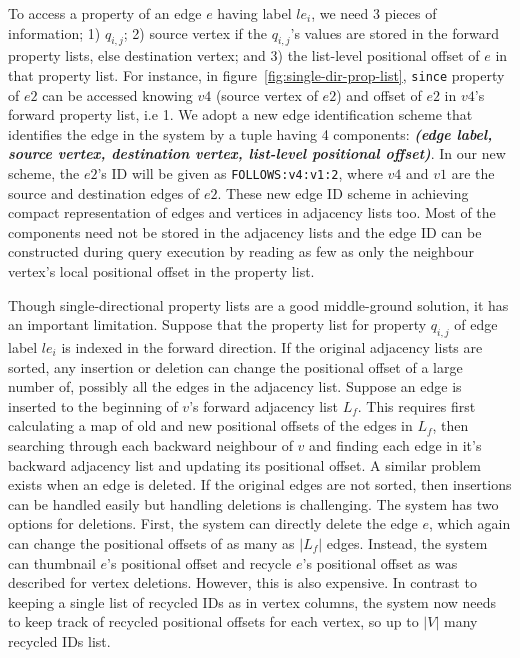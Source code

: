 To access a property of an edge $e$ having label $le_i$, we need 3 pieces of information; 1) $q_{i,j}$; 2) source vertex if the $q_{i,j}$'s values are stored in the forward property lists, else destination vertex; and 3) the list-level positional offset of $e$ in that property list. For instance, in figure~\ref{fig:single-dir-prop-list}, \texttt{since} property of $e2$ can be accessed knowing $v4$ (source vertex of $e2$) and offset of $e2$ in $v4$'s forward property list, i.e 1. We adopt a new edge identification scheme that identifies the edge in the system by a tuple having 4 components: \textbf{\emph{(edge label, source vertex, destination vertex, list-level positional offset)}}. In our new scheme, the $e2$'s ID will be given as \texttt{FOLLOWS:v4:v1:2}, where $v4$ and $v1$ are the source and destination edges of $e2$. These new edge ID scheme in achieving compact representation of edges and vertices in adjacency lists too. Most of the components need not be stored in the adjacency lists and the edge ID can be constructed during query execution by reading as few as only the neighbour vertex's local positional offset in the property list.

 Though single-directional property lists are a good middle-ground solution, it has an important limitation. Suppose that the property list for property $q_{i,j}$ of edge label $le_i$ is indexed in the forward direction. If the original adjacency lists are sorted,  any insertion or deletion can change the positional offset of a large number of, possibly all the edges in the adjacency list. Suppose an edge is inserted to the beginning of $v$'s forward adjacency list $L_f$. This requires first calculating a map of old and new positional offsets of the edges in $L_f$, then searching through each backward neighbour of $v$ and finding each edge in it's backward adjacency list and updating its positional offset. A similar problem exists when an edge is deleted. If the original edges are not sorted, then insertions can be handled easily but handling deletions is challenging. The system has two options for deletions. First, the system can directly delete the edge $e$, which again can change the positional offsets of as many as $|L_f|$ edges. Instead, the system can thumbnail $e$'s positional offset and recycle $e$'s positional offset as was described for vertex deletions. However, this is also expensive. In contrast to keeping a single list of recycled IDs as in vertex columns, the system now needs to keep track of recycled positional offsets for each vertex, so up to $|V|$ many recycled IDs list.

